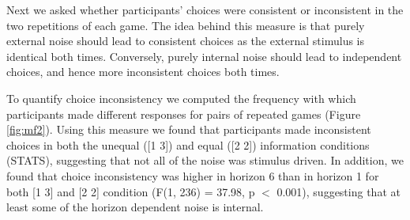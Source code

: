 \documentclass[12pt]{article}
\begin{document}
	
	Next we asked whether participants' choices were consistent or inconsistent in the two repetitions of each game.  The idea behind this measure is that purely external noise should lead to consistent choices as the external stimulus is identical both times. Conversely, purely internal noise should lead to independent choices, and hence more inconsistent choices both times. 
	
	To quantify choice inconsistency we computed the frequency with which participants made different responses for pairs of repeated games (Figure \ref{fig:mf2}). Using this measure we found that participants made inconsistent choices in both the unequal ([1 3]) and equal ([2 2]) information conditions (STATS), suggesting that not all of the noise was stimulus driven. In addition, we found that choice inconsistency was higher in horizon 6 than in horizon 1 for both [1 3] and [2 2] condition (F(1, 236) = 37.98, p $<$ 0.001), suggesting that at least some of the horizon dependent noise is internal.
	
	
	
	
	
\end{document}
